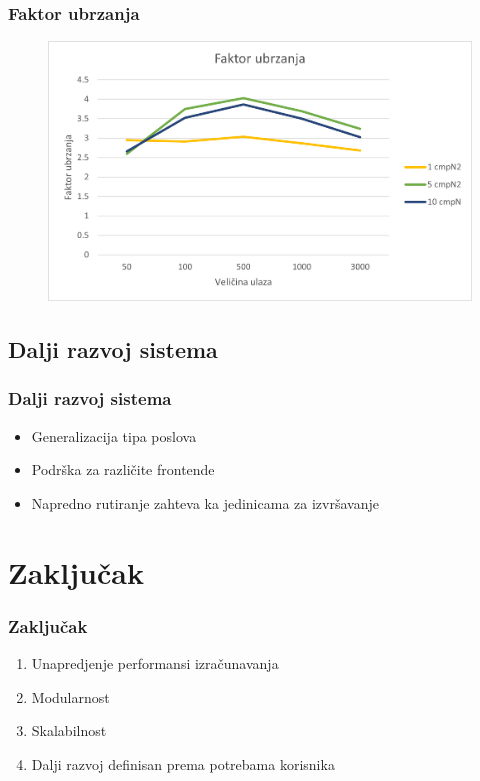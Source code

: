 \documentclass[11pt]{beamer}
\begin{document}

\begin{frame}
	\frametitle{Faktor ubrzanja}

	\begin{figure}
		\includegraphics[width=0.9\linewidth]{./images/perf_faktor_ubrzanja.png}
	\end{figure}

\end{frame}


\subsection{Dalji razvoj sistema}

\begin{frame}
	\frametitle{Dalji razvoj sistema}
	
	\begin{itemize}
		\item Generalizacija tipa poslova
		\item Podrška za različite frontende
		\item Napredno rutiranje zahteva ka jedinicama za izvršavanje
	\end{itemize}

\end{frame}


\section{Zaključak}

\begin{frame}
	\frametitle{Zaključak}
	
	\begin{enumerate}
		\item Unapredjenje performansi izračunavanja
		\item Modularnost
		\item Skalabilnost
		\item Dalji razvoj definisan prema potrebama korisnika
	\end{enumerate}

\end{frame}
\end{document}
